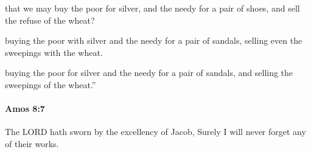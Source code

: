 			\begin{versebox}
					\item[BHS] 
					\item[LXX] 
					\item[ASV] that we may buy the poor for silver, and the needy for a pair of shoes, and sell the refuse of the wheat?
					\item[NIV] buying the poor with silver and the needy for a pair of sandals, selling even the sweepings with the wheat.
					\item[NRSV] buying the poor for silver and the needy for a pair of sandals, and selling the sweepings of the wheat.”
			\end{versebox}

		\paragraph{Amos 8:7} %
			\label{AMOS-8-7}

			The LORD hath sworn by the excellency of Jacob, Surely I will never forget any of their works.


